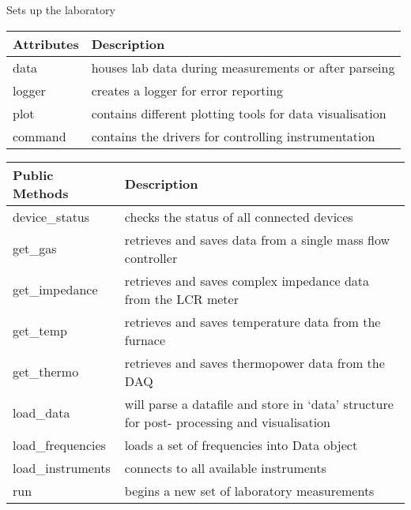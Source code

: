 \documentclass[letterpaper,10pt,english]{sphinxmanual}
\begin{document}
\begin{fulllineitems}
\label{\detokenize{laboratory:laboratory.Setup}}
Sets up the laboratory


\begin{savenotes}\sphinxattablestart
\centering
\begin{tabulary}{\linewidth}[t]{|T|T|}
\hline
\sphinxstyletheadfamily 
Attributes
&\sphinxstyletheadfamily 
Description
\\
\hline
data
&
houses lab data during measurements or after parseing
\\
\hline
logger
&
creates a logger for error reporting
\\
\hline
plot
&
contains different plotting tools for data visualisation
\\
\hline
command
&
contains the drivers for controlling instrumentation
\\
\hline
\end{tabulary}
\par
\sphinxattableend\end{savenotes}


\begin{savenotes}\sphinxattablestart
\centering
\begin{tabulary}{\linewidth}[t]{|T|T|}
\hline
\sphinxstyletheadfamily 
Public Methods
&\sphinxstyletheadfamily 
Description
\\
\hline
device\_status
&
checks the status of all connected devices
\\
\hline
get\_gas
&
retrieves and saves data from a single mass flow controller
\\
\hline
get\_impedance
&
retrieves and saves complex impedance data from the LCR meter
\\
\hline
get\_temp
&
retrieves and saves temperature data from the furnace
\\
\hline
get\_thermo
&
retrieves and saves thermopower data from the DAQ
\\
\hline
load\_data
&
will parse a datafile and store in ‘data’ structure for post-
processing and visualisation
\\
\hline
load\_frequencies
&
loads a set of frequencies into Data object
\\
\hline
load\_instruments
&
connects to all available instruments
\\
\hline
run
&
begins a new set of laboratory measurements
\\
\hline
\end{tabulary}
\par
\sphinxattableend\end{savenotes}



\end{fulllineitems}
\end{document}
